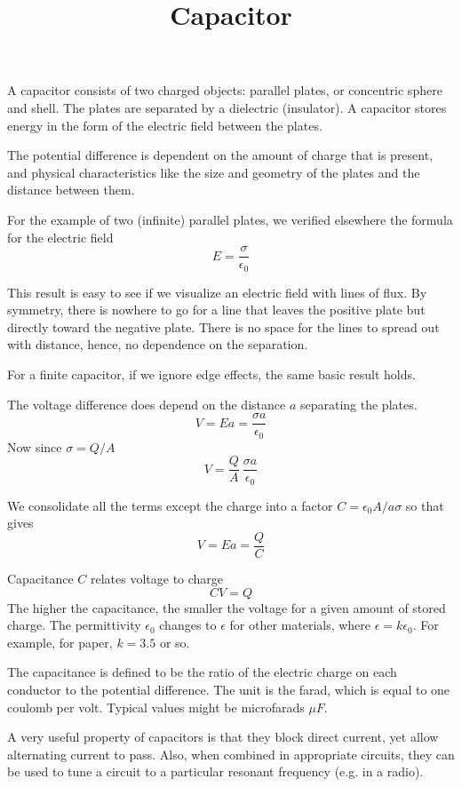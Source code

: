 \documentclass[11pt, oneside]{article}
\title{Capacitor}
\date{}
\begin{document}
\maketitle
\Large

A capacitor consists of two charged objects:  parallel plates, or concentric sphere and shell.  The plates are separated by a dielectric (insulator).  A capacitor stores energy in the form of the electric field between the plates.

The potential difference is dependent on the amount of charge that is present, and physical characteristics like the size and geometry of the plates and the distance between them.

For the example of two (infinite) parallel plates, we verified elsewhere the formula for the electric field
\[ E = \frac{\sigma}{\epsilon_0} \]

This result is easy to see if we visualize an electric field with lines of flux.  By symmetry, there is nowhere to go for a line that leaves the positive plate but directly toward the negative plate.  There is no space for the lines to spread out with distance, hence, no dependence on the separation.

For a finite capacitor, if we ignore edge effects, the same basic result holds. 

The voltage difference does depend on the distance $a$ separating the plates. 
\[ V = Ea = \frac{\sigma a}{\epsilon_0} \]
 Now since $\sigma = Q/A$
\[ V = \frac{Q}{A} \ \frac{\sigma a}{\epsilon_0} \]

We consolidate all the terms except the charge into a factor $C = \epsilon_0 A/a \sigma$ so that gives
\[ V = Ea = \frac{Q}{C} \]

Capacitance $C$ relates voltage to charge
\[ CV = Q \]
The higher the capacitance, the smaller the voltage for a given amount of stored charge.  The permittivity $\epsilon_0$ changes to $\epsilon$ for other materials, where $\epsilon = k \epsilon_0$.  For example, for paper, $k=3.5$ or so.

The capacitance is defined to be the ratio of the electric charge on each conductor to the potential difference.  The unit is the farad, which is equal to one coulomb per volt.  Typical values might be microfarads $\mu F$.

A very useful property of capacitors is that they block direct current, yet allow alternating current to pass.  Also, when combined in appropriate circuits, they can be used to tune a circuit to a particular resonant frequency (e.g. in a radio).
\end{document}
